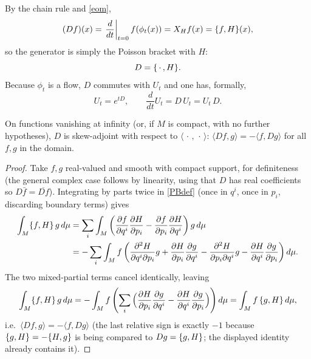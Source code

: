 By the chain rule and \eqref{eom},
\begin{equation}
(Df)(x) = \left.\frac{d}{d t}\right|_{t=0} 
    f(\phi_t(x)) = X_H f(x) = \{f,H\}(x),
\end{equation}
so the generator is simply the Poisson bracket with $H$:
\begin{equation}
D = \{\,\cdot\,,H\}.
\label{Ddef}
\end{equation}
Because $\phi_t$ is a flow, $D$ commutes with $U_t$ and one has, 
formally,
\begin{equation}
U_t = e^{tD}, \qquad \frac{d}{d t}U_t = D\,U_t = U_t\,D.
\label{Uexp}
\end{equation}

\begin{proposition}
\label{skew}
On functions vanishing at infinity (or, if $M$ is compact, with no further 
    hypotheses), $D$ is skew-adjoint with respect to 
    $\langle\,\cdot\,,\,\cdot\,\rangle$: $\langle Df,g\rangle =
    -\langle f,Dg\rangle$ for all $f,g$ in the domain.
\end{proposition}
\begin{proof}
Take $f,g$ real-valued and smooth with compact support, for definiteness 
    (the general complex case follows by linearity, using that $D$ has real
    coefficients so $D\bar f=\overline{Df}$). Integrating by parts twice in 
    \eqref{PBdef} (once in $q^i$, once in $p_i$, discarding boundary terms) 
    gives
\begin{align}
\int_M \{f,H\}\,g\,d\mu
&= \sum_i\int_M\left(\frac{\partial f}{\partial q^i}\frac{\partial H}
    {\partial p_i}-\frac{\partial f}{\partial p_i}\frac{\partial H}
    {\partial q^i}\right)g\,d\mu \notag\\
&= -\sum_i\int_M f\left(\frac{\partial^2H}{\partial q^i\partial p_i}g
    +\frac{\partial H}{\partial p_i}\frac{\partial g}{\partial q^i}
    -\frac{\partial^2H}{\partial p_i\partial q^i}g
    -\frac{\partial H}{\partial q^i}\frac{\partial g}
    {\partial p_i}\right)d\mu.
\end{align}
The two mixed-partial terms cancel identically, leaving
\begin{equation}
\int_M \{f,H\}\,g\,d\mu = -\int_M f\left(\sum_i\Big(\frac{\partial H}
    {\partial p_i}\frac{\partial g}{\partial q^i}-
    \frac{\partial H}{\partial q^i}\frac{\partial g}
    {\partial p_i}\Big)\right)d\mu = \int_M f\,\{g,H\}\,d\mu,
\end{equation}
i.e.\ $\langle Df,g\rangle = -\langle f, Dg\rangle$ (the last relative sign is
    exactly $-1$ because $\{g,H\}=-\{H,g\}$ is being compared to 
    $D g = \{g,H\}$; the displayed identity already contains it).
\end{proof}

